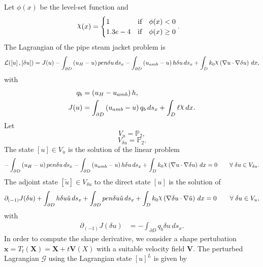 \documentclass[preview]{standalone}
\let\oldcdot\cdot
\let\cdot\oldcdot
\begin{document}
Let $\phi(x)$ be the level-set function and
 \begin{align*}\raisebox{\depth}{$\chi$}(x) &= \begin{cases} 1 & \mbox{if}\quad \phi(x) < 0 \\ 1.3e-4 & \mbox{if}\quad \phi(x)  \ge 0 \end{cases}.\end{align*}
The Lagrangian of the pipe steam jacket problem is
\begin{dmath*}
\mathcal L(\left[ u\right],\left[ \delta u\right]) = J(u) -  \int_{\partial D} \left(u_{H} - u\right) pen \delta u \,ds_x -  \int_{\partial D} \left(u_{amb} - u\right) h \delta u \,ds_x +  \int_{D} k_{0} \raisebox{\depth}{$\chi$} \left(  \nabla u  \cdot  \nabla \delta u  \right) \,dx , 
\end{dmath*}
with 
\begin{align*}
q_{b} &= \left(u_{H} - u_{amb}\right) h,\\
J(u) &=  \int_{\partial D} \left(u_{amb} - u\right) q_{b} \,ds_x +  \int_{D} \ell \raisebox{\depth}{$\chi$} \,dx.
 \end{align*}
Let
\begin{equation*}
V_{u} = \mathbb P_{2},\end{equation*}
\begin{equation*}
V_{\delta u} = \mathbb P_{2}.\end{equation*}
The state $\left[ u\right] \in  V_{u}$ is the solution of the linear problem
\begin{dmath*}
-  \int_{\partial D} \left(u_{H} - u\right) pen \delta u \,ds_x -  \int_{\partial D} \left(u_{amb} - u\right) h \delta u \,ds_x +  \int_{D} k_{0} \raisebox{\depth}{$\chi$} \left(  \nabla u  \cdot  \nabla \delta u  \right) \,dx = 0\qquad \forall\; {\delta u\in V_{\delta u}} . 
\end{dmath*}
The adjoint state $\left[ \tilde u\right] \in  V_{\delta u}$ to the direct state $\left[ u\right]$ is the solution of
\begin{dmath*}
\partial_{(-1)} J(\delta u) +  \int_{\partial D} h \delta u \tilde u \,ds_x +  \int_{\partial D} pen \delta u \tilde u \,ds_x +  \int_{D} k_{0} \raisebox{\depth}{$\chi$} \left(  \nabla \delta u  \cdot  \nabla \tilde u  \right) \,dx = 0\qquad \forall\; {\delta u\in V_{u}} , 
\end{dmath*}
with 
\begin{align*}
\partial_{(-1)} J(\delta u) &= -  \int_{\partial D} q_{b} \delta u \,ds_x.
 \end{align*}
In order to compute the shape derivative, we consider a shape pertubation $\mathbf x = T_t(\mathbf X) = \mathbf X + t \mathbf  V(X)$ with a suitable velocity field $\mathbf V$. The perturbed Lagrangian $\mathcal G$ using the Lagrangian state $\left[ u\right]^{L}$ is given by
\end{document}
